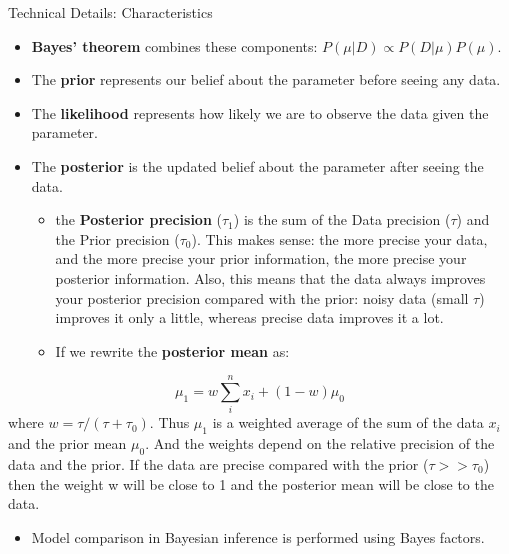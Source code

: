 \begin{frame}{Technical Details: Characteristics}

\begin{itemize}
\item \textbf{Bayes' theorem} combines these components: $P(\mu|D) \propto P(D|\mu) P(\mu)$.
\item The \textbf{prior} represents our belief about the parameter before seeing any data.
\item The \textbf{likelihood} represents how likely we are to observe the data given the parameter.
\item The \textbf{posterior} is the updated belief about the parameter after seeing the data.
\begin{itemize}
\item the \textbf{Posterior precision} ($\tau_1$) is the sum of the Data precision ($\tau$) and the Prior precision ($\tau_0$). This makes sense: the more precise your data, and the more precise your prior information, the more precise your posterior information. Also, this means that the data always improves your posterior precision compared with the prior: noisy data (small $\tau$) improves it only a little, whereas precise data improves it a lot.
\item If we rewrite the \textbf{posterior mean} as:
\end{itemize}
\end{itemize}
    $$
    \mu_1=w\sum_i^n x_i+(1−w)\mu_0
    $$
    where $w=\tau/(\tau+\tau_0)$. Thus $\mu_1$ is a weighted average of the sum of the data $x_i$ and the prior mean $\mu_0$. And the weights depend on the relative precision of the data and the prior. If the data are precise compared with the prior ($\tau>>\tau_0$) then the weight w will be close to 1 and the posterior mean will be close to the data.
\begin{itemize}
\item Model comparison in Bayesian inference is performed using Bayes factors.
\end{itemize}
\end{frame}

